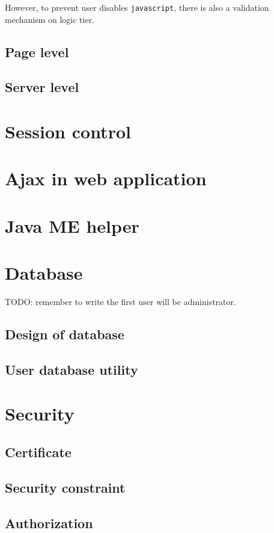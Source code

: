 However, to prevent user disables \texttt{javascript}, there is also a validation mechanism on logic tier.  

\subsection{Page level}
\label{sec:WebApplication:ValidationMechanism:PageLevel}

\subsection{Server level}
\label{sec:WebApplication:ValidationMechanism:ServerLevel}

\section{Session control}
\label{sec:WebApplication:SessionControl}

\section{Ajax in web application}
\label{sec:WebApplication:AjaxInWebApplication}

\section{Java ME helper}
\label{sec:WebApplication:JavaMEHelper}

\section{Database}
\label{sec:WebApplication:Database}

\textsf{TODO: remember to write the first user will be administrator.}


\subsection{Design of database}
\label{sec:WebApplication:Database:DesignOfDatabase}

\subsection{User database utility}
\label{sec:WebApplication:Database:UserDatabaseUtility}

\section{Security}
\label{sec:WebApplication:Security}

\subsection{Certificate}
\label{sec:WebApplication:Security:Certificate}

\subsection{Security constraint}
\label{sec:WebApplication:Security:SecurityConstraint}

\subsection{Authorization}
\label{sec:WebApplication:Authorization}

